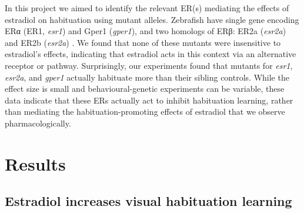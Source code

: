 \documentclass[9.5pt,lineno]{RandlettLab_elife}
\begin{document}
In this project we aimed to identify the relevant ER(s) mediating the effects of estradiol on habituation using mutant alleles.
Zebrafish have single gene encoding ERα (ER1, \emph{esr1}) and Gper1 (\emph{gper1}), and two homologs of ERβ: ER2a (\emph{esr2a}) and ER2b (\emph{esr2a})  \citep{Romano2017-ep, Menuet2002-fo}.  
We found that none of these mutants were insensitive to estradiol's effects, indicating that estradiol acts in this context via an alternative receptor or pathway. 
Surprisingly, our experiments found that mutants for \emph{esr1}, \emph{esr2a}, and \emph{gper1} actually habituate more than their sibling controls. 
While the effect size is small and behavioural-genetic experiments can be variable, these data indicate that these ERs actually act to inhibit habituation learning, rather than mediating the habituation-promoting effects of estradiol that we observe pharmacologically. 

\newpage

\section{Results}

\subsection{Estradiol increases visual habituation learning}
\end{document}

